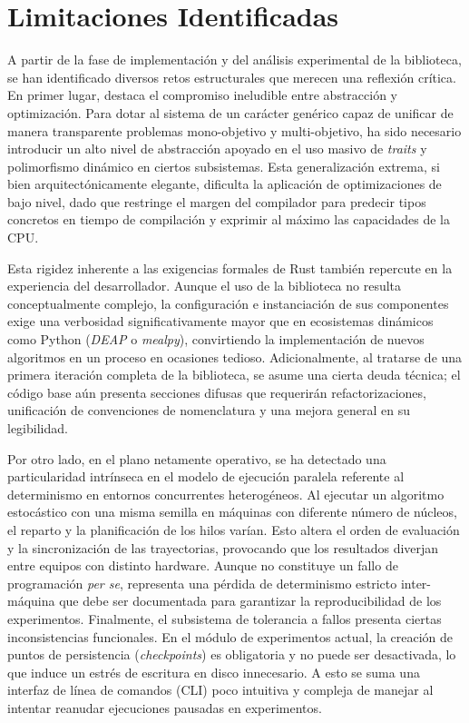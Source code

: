 \documentclass[12pt,a4paper,twoside,openright]{book}
\begin{document}
\section{Limitaciones Identificadas}
    A partir de la fase de implementación y del análisis experimental de la biblioteca, se han identificado diversos retos estructurales que merecen una reflexión crítica. En primer lugar, destaca el compromiso ineludible entre abstracción y optimización. Para dotar al sistema de un carácter genérico capaz de unificar de manera transparente problemas mono-objetivo y multi-objetivo, ha sido necesario introducir un alto nivel de abstracción apoyado en el uso masivo de \textit{traits} y polimorfismo dinámico en ciertos subsistemas. Esta generalización extrema, si bien arquitectónicamente elegante, dificulta la aplicación de optimizaciones de bajo nivel, dado que restringe el margen del compilador para predecir tipos concretos en tiempo de compilación y exprimir al máximo las capacidades de la CPU.

    Esta rigidez inherente a las exigencias formales de Rust también repercute en la experiencia del desarrollador. Aunque el uso de la biblioteca no resulta conceptualmente complejo, la configuración e instanciación de sus componentes exige una verbosidad significativamente mayor que en ecosistemas dinámicos como Python (\textit{DEAP} o \textit{mealpy}), convirtiendo la implementación de nuevos algoritmos en un proceso en ocasiones tedioso. Adicionalmente, al tratarse de una primera iteración completa de la biblioteca, se asume una cierta deuda técnica; el código base aún presenta secciones difusas que requerirán refactorizaciones, unificación de convenciones de nomenclatura y una mejora general en su legibilidad.

    Por otro lado, en el plano netamente operativo, se ha detectado una particularidad intrínseca en el modelo de ejecución paralela referente al determinismo en entornos concurrentes heterogéneos. Al ejecutar un algoritmo estocástico con una misma semilla en máquinas con diferente número de núcleos, el reparto y la planificación de los hilos varían. Esto altera el orden de evaluación y la sincronización de las trayectorias, provocando que los resultados diverjan entre equipos con distinto hardware. Aunque no constituye un fallo de programación \textit{per se}, representa una pérdida de determinismo estricto inter-máquina que debe ser documentada para garantizar la reproducibilidad de los experimentos. Finalmente, el subsistema de tolerancia a fallos presenta ciertas inconsistencias funcionales. En el módulo de experimentos actual, la creación de puntos de persistencia (\textit{checkpoints}) es obligatoria y no puede ser desactivada, lo que induce un estrés de escritura en disco innecesario. A esto se suma una interfaz de línea de comandos (CLI) poco intuitiva y compleja de manejar al intentar reanudar ejecuciones pausadas en experimentos.
\end{document}
